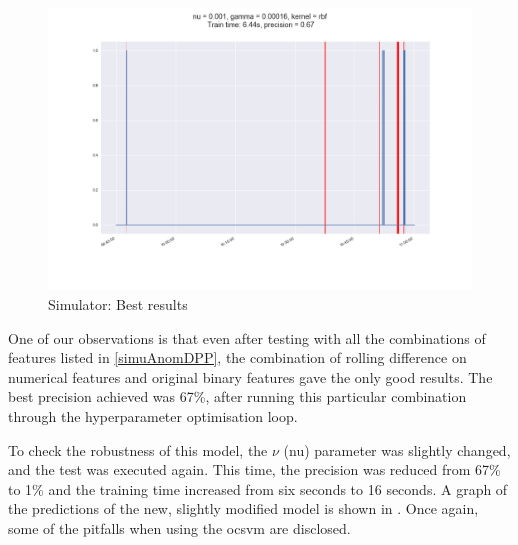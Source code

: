 \documentclass[english, a4paper]{report}
\begin{document}
{{{            \begin{figure}[H]
                \centering
                \includegraphics[width=\textwidth, height=.42\textheight]{anom-simu-good}
                \caption{Simulator: Best results}
                \label{fig:simuADgood}
            \end{figure}
            
            One of our observations is that even after testing with all the combinations of features listed in \ref{simuAnomDPP}, the combination of rolling difference on numerical features and original binary features gave the only good results. The best precision achieved was 67\%, after running this particular combination through the hyperparameter optimisation loop.
            \par
            To check the robustness of this model, the \begin{math}\nu \end{math} (nu) parameter was slightly changed, and the test was executed again. This time, the precision was reduced from 67\% to 1\% and the training time increased from six seconds to 16 seconds. A graph of the predictions of the new, slightly modified model is shown in . Once again, some of the pitfalls when using the \gls{ocsvm} are disclosed.
            
}}}
\end{document}
